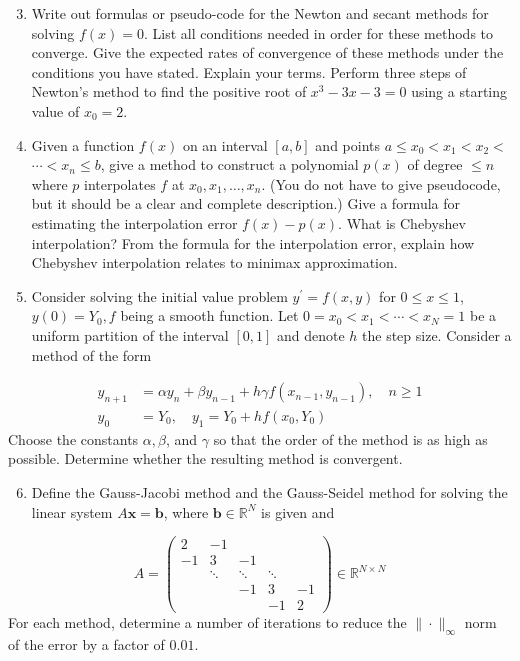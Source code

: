\documentclass[10pt]{article}
\begin{document}
\begin{enumerate}
  \setcounter{enumi}{2}
  \item Write out formulas or pseudo-code for the Newton and secant methods for solving $f(x)=0$. List all conditions needed in order for these methods to converge. Give the expected rates of convergence of these methods under the conditions you have stated. Explain your terms. Perform three steps of Newton's method to find the positive root of $x^{3}-3 x-3=0$ using a starting value of $x_{0}=2$.

  \item Given a function $f(x)$ on an interval $[a, b]$ and points $a \leq x_{0}<x_{1}<x_{2}<$ $\cdots<x_{n} \leq b$, give a method to construct a polynomial $p(x)$ of degree $\leq n$ where $p$ interpolates $f$ at $x_{0}, x_{1}, \ldots, x_{n}$. (You do not have to give pseudocode, but it should be a clear and complete description.) Give a formula for estimating the interpolation error $f(x)-p(x)$. What is Chebyshev interpolation? From the formula for the interpolation error, explain how Chebyshev interpolation relates to minimax approximation.

  \item Consider solving the initial value problem $y^{\prime}=f(x, y)$ for $0 \leq x \leq 1$, $y(0)=Y_{0}, f$ being a smooth function. Let $0=x_{0}<x_{1}<\cdots<x_{N}=1$ be a uniform partition of the interval $[0,1]$ and denote $h$ the step size. Consider a method of the form

\end{enumerate}
$$
\begin{aligned}
y_{n+1} &=\alpha y_{n}+\beta y_{n-1}+h \gamma f\left(x_{n-1}, y_{n-1}\right), \quad n \geq 1 \\
y_{0} &=Y_{0}, \quad y_{1}=Y_{0}+h f\left(x_{0}, Y_{0}\right)
\end{aligned}
$$
Choose the constants $\alpha, \beta$, and $\gamma$ so that the order of the method is as high as possible. Determine whether the resulting method is convergent.

\begin{enumerate}
  \setcounter{enumi}{5}
  \item Define the Gauss-Jacobi method and the Gauss-Seidel method for solving the linear system $A \mathbf{x}=\mathbf{b}$, where $\mathbf{b} \in \mathbb{R}^{N}$ is given and
\end{enumerate}
$$
A=\left(\begin{array}{ccccc}
2 & -1 & & & \\
-1 & 3 & -1 & & \\
& \ddots & \ddots & \ddots & \\
& & -1 & 3 & -1 \\
& & & -1 & 2
\end{array}\right) \in \mathbb{R}^{N \times N}
$$
For each method, determine a number of iterations to reduce the $\|\cdot\|_{\infty}$ norm of the error by a factor of $0.01$.
\end{document}
